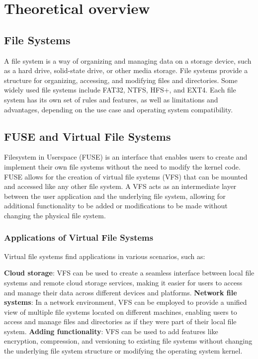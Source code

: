 \chapter{Theoretical overview}
\label{chap:refs}

\section{File Systems}

A file system is a way of organizing and managing data on a storage device, such as a hard drive, solid-state drive, or other media storage.
File systems provide a structure for organizing, accessing, and modifying files and directories.
Some widely used file systems include FAT32, NTFS, HFS+, and EXT4. Each file system has its own set of rules and features, as well as limitations and advantages, depending on the use case and operating system compatibility.

\section{FUSE and Virtual File Systems}

Filesystem in Userspace (FUSE) is an interface that enables users to create and implement their own file systems without the need to modify the kernel code.
FUSE allows for the creation of virtual file systems (VFS) that can be mounted and accessed like any other file system.
A VFS acts as an intermediate layer between the user application and the underlying file system, allowing for additional functionality to be added or modifications to be made without changing the physical file system.

\subsection{Applications of Virtual File Systems}

Virtual file systems find applications in various scenarios, such as:

\textbf{Cloud storage}: VFS can be used to create a seamless interface between local file systems and remote cloud storage services, making it easier for users to access and manage their data across different devices and platforms.
\textbf{Network file systems}: In a network environment, VFS can be employed to provide a unified view of multiple file systems located on different machines, enabling users to access and manage files and directories as if they were part of their local file system.
\textbf{Adding functionality}: VFS can be used to add features like encryption, compression, and versioning to existing file systems without changing the underlying file system structure or modifying the operating system kernel.

